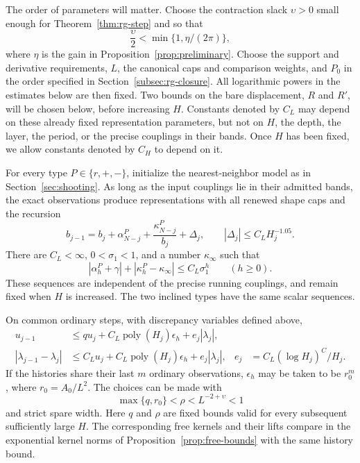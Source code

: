 The order of parameters will matter.  Choose the contraction slack
$\upsilon>0$ small enough for Theorem~\ref{thm:rg-step} and so that
\begin{equation}
 \frac{\upsilon}{2}<\min\{1,\eta/(2\pi)\},
 \label{eq:offset-slack}
\end{equation}
where $\eta$ is the gain in Proposition~\ref{prop:preliminary}.
Choose the support and derivative requirements, $L$, the canonical
caps and comparison weights, and $P_0$ in the order specified in
Section~\ref{subsec:rg-closure}.  All logarithmic powers in the
estimates below are then fixed.  Two bounds on the bare displacement,
$R$ and $R'$, will be chosen below, before increasing $H$.
Constants denoted by $C_L$ may depend on these already fixed
representation parameters, but not on $H$, the depth, the layer,
the period, or the precise couplings in their bands.  Once $H$ has
been fixed, we allow constants denoted by $C_H$ to depend on it.

\begin{proposition}
\label{prop:rg-input}
For every type $P\in\{r,+,-\}$, initialize the nearest-neighbor model
as in Section~\ref{sec:shooting}.  As long as the input couplings lie
in their admitted bands, the exact observations produce representations
with all renewed shape caps and the recursion
\begin{equation}
 b_{j-1}=b_j+\alpha^P_{N-j}
              +\frac{\kappa^P_{N-j}}{b_j}+\Delta_j,
 \qquad |\Delta_j|\le C_LH_j^{-1.05}.
 \label{eq:offset-flow}
\end{equation}
There are $C_L<\infty$, $0<\sigma_1<1$, and a number
$\kappa_\infty$ such that
\begin{equation}
 |\alpha_h^P+\gamma|+|\kappa_h^P-\kappa_\infty|
       \le C_L\sigma_1^h \qquad(h\ge0).
 \label{eq:offset-increment-convergence}
\end{equation}
These sequences are independent of the precise running couplings,
and remain fixed when $H$ is increased.  The two inclined types have
the same scalar sequences.

On common ordinary steps, with discrepancy variables defined above,
\begin{align}
 u_{j-1}&\le q u_j+C_L\operatorname{poly}(H_j)\epsilon_h
                        +e_j|\lambda_j|,\nonumber\\
 |\lambda_{j-1}-\lambda_j|
     &\le C_Lu_j+C_L\operatorname{poly}(H_j)\epsilon_h
                        +e_j|\lambda_j|,
 & e_j&=C_L(\log H_j)^C/H_j.
 \label{eq:offset-weak-comparison}
\end{align}
If the histories share their last $m$ ordinary observations,
$\epsilon_h$ may be taken to be $r_0^m$, where $r_0=A_0/L^2$.
The choices can be made with
\begin{equation}
 \max\{q,r_0\}<\rho<L^{-2+\upsilon}<1
 \label{eq:offset-contraction-width}
\end{equation}
and strict spare width.  Here $q$ and $\rho$ are fixed bounds valid
for every subsequent sufficiently large $H$.  The corresponding free kernels and their
lifts compare in the exponential kernel norms of
Proposition~\ref{prop:free-bounds} with the same history bound.
\end{proposition}

